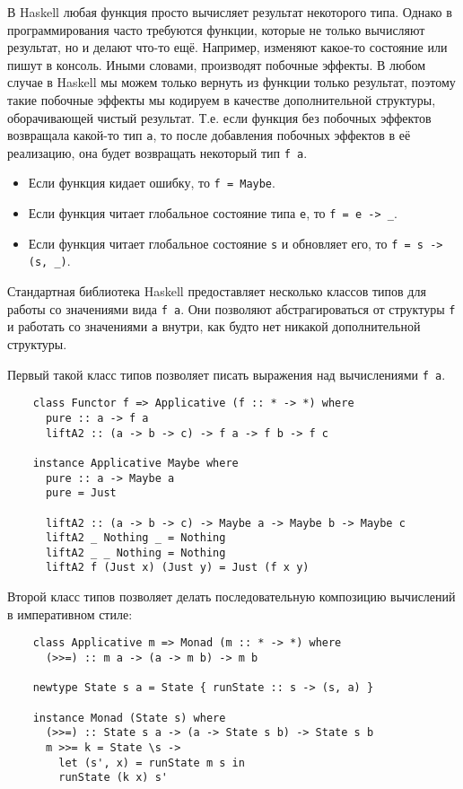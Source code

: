 В Haskell любая функция просто вычисляет результат некоторого типа.
Однако в программирования часто требуются функции, которые не только вычисляют результат, но и делают что-то ещё.
Например, изменяют какое-то состояние или пишут в консоль.
Иными словами, производят побочные эффекты.
В любом случае в Haskell мы можем только вернуть из функции только результат, поэтому такие побочные эффекты мы кодируем в качестве дополнительной структуры, оборачивающей чистый результат.
Т.е. если функция без побочных эффектов возвращала какой-то тип \texttt{a}, то после добавления побочных эффектов в её реализацию, она будет возвращать некоторый тип  \texttt{f a}.

\begin{itemize}
    \item Если функция кидает ошибку, то \texttt{f = Maybe}.
    \item Если функция читает глобальное состояние типа \texttt{e}, то \texttt{f = e -> \_}.
    \item Если функция читает глобальное состояние \texttt{s} и обновляет его, то \texttt{f = s -> (s, \_)}.
\end{itemize}

Стандартная библиотека Haskell предоставляет несколько классов типов для работы со значениями вида \texttt{f a}.
Они позволяют абстрагироваться от структуры \texttt{f} и работать со значениями \texttt{a} внутри, как будто нет никакой дополнительной структуры.

Первый такой класс типов позволяет писать выражения над вычислениями \texttt{f a}.
\begin{verbatim}
    class Functor f => Applicative (f :: * -> *) where
      pure :: a -> f a
      liftA2 :: (a -> b -> c) -> f a -> f b -> f c

    instance Applicative Maybe where
      pure :: a -> Maybe a
      pure = Just

      liftA2 :: (a -> b -> c) -> Maybe a -> Maybe b -> Maybe c
      liftA2 _ Nothing _ = Nothing
      liftA2 _ _ Nothing = Nothing
      liftA2 f (Just x) (Just y) = Just (f x y)
\end{verbatim}

Второй класс типов позволяет делать последовательную композицию вычислений в императивном стиле:
\begin{verbatim}
    class Applicative m => Monad (m :: * -> *) where
      (>>=) :: m a -> (a -> m b) -> m b

    newtype State s a = State { runState :: s -> (s, a) }

    instance Monad (State s) where
      (>>=) :: State s a -> (a -> State s b) -> State s b
      m >>= k = State \s ->
        let (s', x) = runState m s in
        runState (k x) s'
\end{verbatim}

